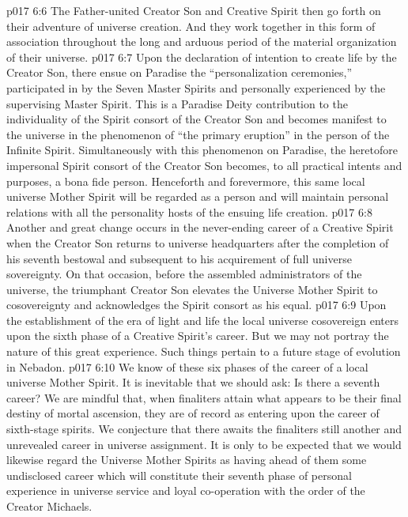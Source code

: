 \vs p017 6:6 The Father\hyp{}united Creator Son and Creative Spirit then go forth on their adventure of universe creation. And they work together in this form of association throughout the long and arduous period of the material organization of their universe.
\vs p017 6:7 \pc {}\bibnobreakspace {} Upon the declaration of intention to create life by the Creator Son, there ensue on Paradise the “personalization ceremonies,” participated in by the Seven Master Spirits and personally experienced by the supervising Master Spirit. This is a Paradise Deity contribution to the individuality of the Spirit consort of the Creator Son and becomes manifest to the universe in the phenomenon of “the primary eruption” in the person of the Infinite Spirit. Simultaneously with this phenomenon on Paradise, the heretofore impersonal Spirit consort of the Creator Son becomes, to all practical intents and purposes, a bona fide person. Henceforth and forevermore, this same local universe Mother Spirit will be regarded as a person and will maintain personal relations with all the personality hosts of the ensuing life creation.
\vs p017 6:8 \pc {}\bibnobreakspace {} Another and great change occurs in the never\hyp{}ending career of a Creative Spirit when the Creator Son returns to universe headquarters after the completion of his seventh bestowal and subsequent to his acquirement of full universe sovereignty. On that occasion, before the assembled administrators of the universe, the triumphant Creator Son elevates the Universe Mother Spirit to cosovereignty and acknowledges the Spirit consort as his equal.
\vs p017 6:9 \pc {}\bibnobreakspace {} Upon the establishment of the era of light and life the local universe cosovereign enters upon the sixth phase of a Creative Spirit’s career. But we may not portray the nature of this great experience. Such things pertain to a future stage of evolution in Nebadon.
\vs p017 6:10 \pc {}\bibnobreakspace {} We know of these six phases of the career of a local universe Mother Spirit. It is inevitable that we should ask: Is there a seventh career? We are mindful that, when finaliters attain what appears to be their final destiny of mortal ascension, they are of record as entering upon the career of sixth\hyp{}stage spirits. We conjecture that there awaits the finaliters still another and unrevealed career in universe assignment. It is only to be expected that we would likewise regard the Universe Mother Spirits as having ahead of them some undisclosed career which will constitute their seventh phase of personal experience in universe service and loyal co\hyp{}operation with the order of the Creator Michaels.
